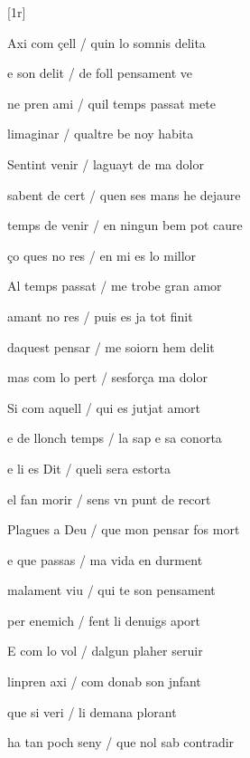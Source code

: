 




[1r]
\begin{estrofa}

 Axi com \c{c}ell / quin lo somnis delita

 e son delit / de foll pensament ve

 ne pren ami / quil temps passat mete

 limaginar / qualtre be noy habita

 Sentint venir / laguayt de ma dolor

 sabent de cert / quen ses mans he dejaure

 temps de venir / en ningun bem pot caure

 \c{c}o ques no res / en mi es lo millor

\end{estrofa}



\begin{estrofa}

 Al temps passat / me trobe gran amor

 amant no res / puis es ja tot finit

 daquest pensar / me soiorn hem delit

 mas com lo pert / sesfor\c{c}a ma dolor

 Si com aquell / qui es jutjat amort

 e de llonch temps / la sap e sa conorta

 e li es Dit / queli sera estorta

 el fan morir / sens vn punt de recort

\end{estrofa}



\begin{estrofa}

 Plagues a Deu / que mon pensar fos mort

 e que passas / ma vida en durment

 malament viu / qui te son pensament

 per enemich / fent li denuigs aport

 E com lo vol / dalgun plaher seruir

 linpren axi / com donab son jnfant

 que si veri / li demana plorant

 ha tan poch seny / que nol sab contradir

\end{estrofa}


